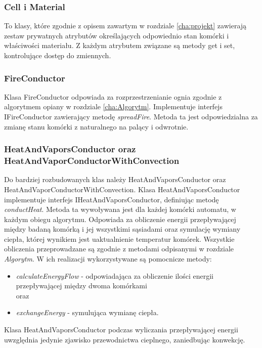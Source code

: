 \subsubsection{Cell i Material}
To klasy, które zgodnie z opisem zawartym w rozdziale \ref{cha:projekt} zawierają zestaw prywatnych atrybutów określających  odpowiednio stan komórki i właściwości materiału. Z każdym atrybutem związane są metody get i set, kontrolujące dostęp do zmiennych. 

\subsubsection{FireConductor}
Klasa FireConductor odpowiada za rozprzestrzenianie ognia zgodnie z algorytmem opiany w rozdziale \ref{cha:Algorytm}.
Implementuje interfejs IFireConductor zawierający metodę \textit{spreadFire}. Metoda ta jest odpowiedzialna za zmianę stanu komórki
z naturalnego na palący i odwrotnie.

\subsubsection{HeatAndVaporsConductor oraz HeatAndVaporConductorWithConvection}
Do bardziej rozbudowanych klas należy HeatAndVaporsConductor oraz HeatAndVaporConductorWithConvection.
Klasa HeatAndVaporsConductor implementuje interfejs IHeatAndVaporsConductor, definiując metodę \textit{conductHeat}.
Metoda ta wywoływana jest dla każdej komórki automatu, w każdym obiegu algorytmu.
Odpowiada za obliczenie energii przepływającej między badaną komórką i jej wszystkimi sąsiadami oraz symulację wymiany ciepła, 
której wynikiem jest uaktualnienie temperatur komórek. Wszystkie obliczenia przeprowadzane są zgodnie z metodami odpisanymi w rozdziale \textit{Algorytm}. W ich realizacji wykorzystywane są pomocnicze metody: 
\begin{itemize}
\item \textit{calculateEnergyFlow} - odpowiadająca za obliczenie ilości energii przepływającej między dwoma komórkami \\ 
oraz 
\item \textit{exchangeEnergy} - symulująca wymianę ciepła. 
\end{itemize}
Klasa HeatAndVaporsConductor podczas wyliczania przepływającej energii uwzględnia jedynie zjawisko przewodnictwa cieplnego, zaniedbując konwekcję. 

